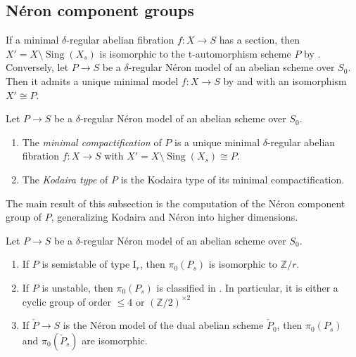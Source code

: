 \documentclass[reqno, letterpaper]{amsart}
\numberwithin{equation}{subsection}
\let\to\longrightarrow
\newcommand{\ZZ}{\mathbb{Z}}
\DeclareMathOperator{\Sing}{Sing}
\begin{document}
		
		
	\subsection{N\'eron component groups}
		If a minimal $\delta$-regular abelian fibration $f : X \to S$ has a section, then $X' = X \setminus \Sing(X_s)$ is isomorphic to the t-automorphism scheme $P$ by . Conversely, let $P \to S$ be a $\delta$-regular N\'eron model of an abelian scheme over $S_0$. Then it admits a unique minimal model $f : X \to S$ by  and  with an isomorphism $X' \cong P$.
		
		\begin{definition} \label{def:Kodaira type of t-automorphism group}
			Let $P \to S$ be a $\delta$-regular N\'eron model of an abelian scheme over $S_0$.
			\begin{enumerate}
				\item The \emph{minimal compactification} of $P$ is a unique minimal $\delta$-regular abelian fibration $f : X \to S$ with $X' = X \setminus \Sing(X_s) \cong P$.
				\item The \emph{Kodaira type} of $P$ is the Kodaira type of its minimal compactification.
			\end{enumerate}
		\end{definition}
		
		The main result of this subsection is the computation of the N\'eron component group of $P$, generalizing Kodaira \cite[Table~1 in p.604]{kod63} and N\'eron \cite[Table in pp.124--125]{neron:original_article} into higher dimensions.
		
		\begin{theorem} \label{thm:classification of component group}
			Let $P \to S$ be a $\delta$-regular N\'eron model of an abelian scheme over $S_0$.
			\begin{enumerate}
				\item If $P$ is semistable of type $\mathrm I_r$, then $\pi_0(P_s)$ is isomorphic to $\ZZ/r$.
				\item If $P$ is unstable, then $\pi_0(P_s)$ is classified in . In particular, it is either a cyclic group of order $\le 4$ or $(\ZZ/2)^{\times 2}$
				\item If $\check P \to S$ is the N\'eron model of the dual abelian scheme $\check P_0$, then $\pi_0(P_s)$ and $\pi_0(\check P_s)$ are isomorphic.
			\end{enumerate}
		\end{theorem}
		
\end{document}
